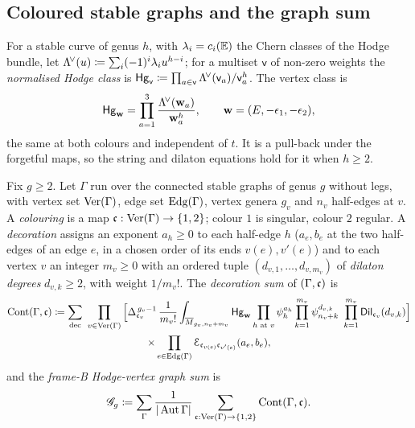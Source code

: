 \subsection{Coloured stable graphs and the graph sum}
\label{sec:set-graphsum}

For a stable curve of genus $h$, with $\lambda_i=c_i(\mathbb{E})$ the Chern classes of the Hodge bundle, let $\Lambda^{\!\vee}(u)\coloneqq\sum_i(-1)^i\lambda_iu^{h-i}$; for a multiset $\mathsf{v}$ of non-zero weights the \emph{normalised Hodge class} is $\mathsf{Hg}_{\mathsf{v}}\coloneqq\prod_{a\in\mathsf{v}}\Lambda^{\!\vee}(\mathsf{v}_a)/\mathsf{v}_a^{h}$. The vertex class is
\begin{equation}
\label{eq:set-Hg}
\mathsf{Hg}_{\mathbf{w}}=\prod_{a=1}^{3}\frac{\Lambda^{\!\vee}(\mathbf{w}_a)}{\mathbf{w}_a^{h}},\qquad \mathbf{w}=(E,-\epsilon_1,-\epsilon_2),
\end{equation}
the same at both colours and independent of $t$. It is a pull-back under the forgetful maps, so the string and dilaton equations hold for it when $h\geq2$.

\begin{defn}
\label{def:set-graphsum}
Fix $g\geq2$. Let $\Gamma$ run over the connected stable graphs of genus $g$ without legs, with vertex set $\mathrm{Ver}(\Gamma)$, edge set $\mathrm{Edg}(\Gamma)$, vertex genera $g_v$ and $n_v$ half-edges at $v$. A \emph{colouring} is a map $\mathfrak{c}:\mathrm{Ver}(\Gamma)\to\{1,2\}$; colour $1$ is singular, colour $2$ regular. A \emph{decoration} assigns an exponent $a_h\geq0$ to each half-edge $h$ ($a_e,b_e$ at the two half-edges of an edge $e$, in a chosen order of its ends $v(e),v'(e)$) and to each vertex $v$ an integer $m_v\geq0$ with an ordered tuple $(d_{v,1},\ldots,d_{v,m_v})$ of \emph{dilaton degrees} $d_{v,k}\geq2$, with weight $1/m_v!$. The \emph{decoration sum} of $(\Gamma,\mathfrak{c})$ is
\begin{multline}
\label{eq:set-graphsum}
\GCont(\Gamma,\col)\coloneqq\sum_{\mathrm{dec}}\ \prod_{v\in\Ver(\Gamma)}\Big[\Delta_{\col_v}^{\,g_v-1}\,\frac{1}{m_v!}\int_{\Mbar_{g_v,n_v+m_v}}\Hg_{\bw}\prod_{h\text{ at }v}\psi_h^{a_h}\prod_{k=1}^{m_v}\psi_{n_v+k}^{d_{v,k}}\ \prod_{k=1}^{m_v}\Dil_{\col_v}(d_{v,k})\Big]\\
\times\prod_{e\in\Edg(\Gamma)}\Edge_{\col_{v(e)}\col_{v'(e)}}(a_e,b_e),
\end{multline}
and the \emph{frame-B Hodge-vertex graph sum} is
\begin{equation}
\label{eq:set-Gsum}
\mathscr{G}_g\coloneqq\sum_{\Gamma}\frac{1}{|\operatorname{Aut}\Gamma|}\sum_{\mathfrak{c}:\mathrm{Ver}(\Gamma)\to\{1,2\}}\mathrm{Cont}(\Gamma,\mathfrak{c}).
\end{equation}
\end{defn}

